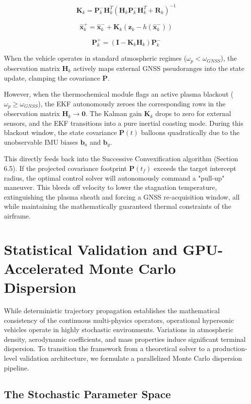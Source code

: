 \documentclass[11pt,a4paper]{article}
\theoremstyle{definition}
\numberwithin{equation}{section}
\begin{document}
$$\mathbf{K}_k = \mathbf{P}_k^- \mathbf{H}_k^T (\mathbf{H}_k \mathbf{P}_k^- \mathbf{H}_k^T + \mathbf{R}_k)^{-1}$$

$$\hat{\mathbf{x}}_k^+ = \hat{\mathbf{x}}_k^- + \mathbf{K}_k (\mathbf{z}_k - h(\hat{\mathbf{x}}_k^-))$$

$$\mathbf{P}_k^+ = (\mathbf{I} - \mathbf{K}_k \mathbf{H}_k) \mathbf{P}_k^-$$

When the vehicle operates in standard atmospheric regimes ($\omega_p < \omega_{GNSS}$), the observation matrix $\mathbf{H}_k$ actively maps external GNSS pseudoranges into the state update, clamping the covariance $\mathbf{P}$.

However, when the thermochemical module flags an active plasma blackout ($\omega_p \ge \omega_{GNSS}$), the EKF autonomously zeroes the corresponding rows in the observation matrix $\mathbf{H}_k \to \mathbf{0}$. The Kalman gain $\mathbf{K}_k$ drops to zero for external sensors, and the EKF transitions into a pure inertial coasting mode. During this blackout window, the state covariance $\mathbf{P}(t)$ balloons quadratically due to the unobservable IMU biases $\mathbf{b}_a$ and $\mathbf{b}_g$.

This directly feeds back into the Successive Convexification algorithm (Section 6.5). If the projected covariance footprint $\mathbf{P}(t_f)$ exceeds the target intercept radius, the optimal control solver will autonomously command a "pull-up" maneuver. This bleeds off velocity to lower the stagnation temperature, extinguishing the plasma sheath and forcing a GNSS re-acquisition window, all while maintaining the mathematically guaranteed thermal constraints of the airframe.

\section{Statistical Validation and GPU-Accelerated Monte Carlo Dispersion}
\label{sec:monte_carlo_validation}

While deterministic trajectory propagation establishes the mathematical consistency of the continuous multi-physics operators, operational hypersonic vehicles operate in highly stochastic environments. Variations in atmospheric density, aerodynamic coefficients, and mass properties induce significant terminal dispersion. To transition the framework from a theoretical solver to a production-level validation architecture, we formulate a parallelized Monte Carlo dispersion pipeline.

\subsection{The Stochastic Parameter Space}
\end{document}
